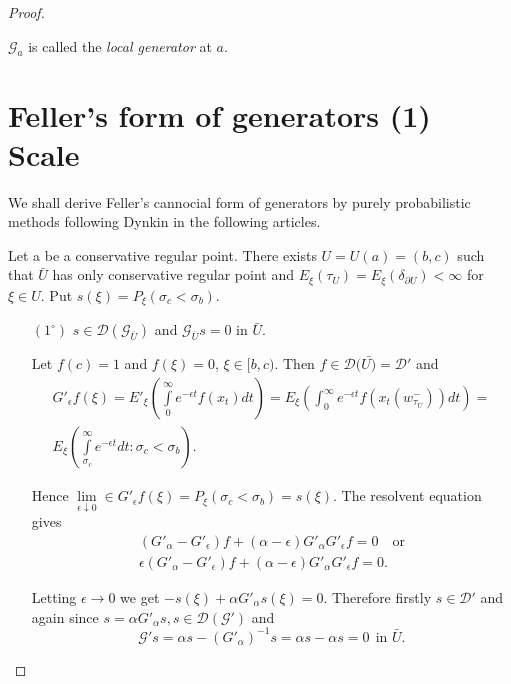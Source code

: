 \begin{proof}
\begin{defi*}%
$\mathscr{G}_a$ is called the {\em local generator } at $a$.
\end{defi*}

\section{Feller's form of generators (1) Scale}\label{chap6-sec4}%

We shall derive Feller's cannocial form of generators by purely
probabilistic methods following Dynkin in the following articles.  

Let a be a conservative regular point. There exists $U = U (a) = (b,
c)$ such that $\bar{U}$ has only conservative regular point and $E_\xi
(\tau_U ) = E_\xi (\delta _{\partial U})< \infty$ for $\xi \in U$. Put
$s(\xi) = P_\xi (\sigma _c < \sigma _b)$. 
\begin{itemize}
\item[$(1^\circ)$] $s\in \mathscr{D}
(\mathscr{G}_{\bar{U}})$ and $\mathscr{G}_{\bar{U}} s = 0 $ in
$\bar{U}$. 

Let $f(c)= 1$ and $f(\xi) = 0$, $\xi \in [b,c)$. Then $f \in
\mathscr{D}(\bar{U)}= \mathscr{D}'$ and 
\begin{gather*}
G'_\epsilon f(\xi) = E'_\xi
\left(\int\limits^{\infty}_{0} e^{-\epsilon t} f (x_t) dt\right) =
E_\xi \left(
\int^{\infty}_{0} e^{-\epsilon t} f(x_t (w^-_{\tau_U})) dt\right)=\\
E_\xi \left(
\int\limits^{\infty}_{\sigma_c} e^{-\epsilon t} dt: \sigma_c <
\sigma_b\right).
\end{gather*}\pageoriginale

Hence $\lim\limits_{\epsilon \downarrow 0} \in G'_\epsilon f(\xi) = P_\xi
(\sigma_c < \sigma_b) = s(\xi)$. The resolvent equation gives 
\begin{gather*}
(G'_\alpha - G'_\epsilon) f + (\alpha - \epsilon) G'_\alpha
  G'_\epsilon f =0\quad \text{or}\\ 
  \epsilon (G'_\alpha - G'_\epsilon) f + (\alpha - \epsilon) G'_\alpha
  G'_\epsilon f = 0. 
\end{gather*}

Letting $\epsilon \to 0$ we get $-s(\xi) + \alpha G'_\alpha s(\xi) =
0$. Therefore firstly $s \in \mathscr{D}'$ and again since $s = \alpha 
G'_\alpha s, s\in\mathscr{D(\mathscr{G'})}$ and  
$$
\mathscr{G}' s=\alpha s- (G'_\alpha)^{-1} s = \alpha s-\alpha s = 0\ \
\text{in\ }\bar{U}. 
$$


\end{itemize}
\end{proof}
